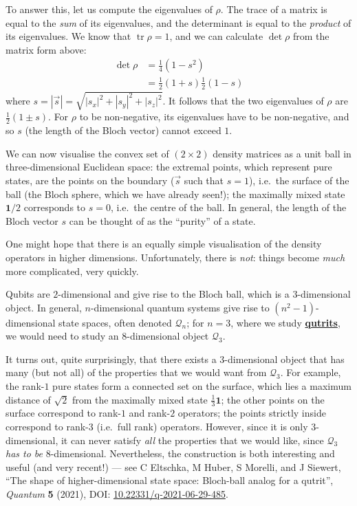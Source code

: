 \documentclass[fleqn]{article}
\newenvironment{technical}{\noindent}{\medskip}
\begin{document}
To answer this, let us compute the eigenvalues of \(\rho\).
The trace of a matrix is equal to the \emph{sum} of its eigenvalues, and the determinant is equal to the \emph{product} of its eigenvalues.
We know that \(\operatorname{tr}\rho=1\), and we can calculate \(\det\rho\) from the matrix form above:
\[
  \begin{aligned}
    \det\rho
    &= \frac{1}{4}(1-s^2)
  \\&= \frac{1}{2}(1+s)\frac{1}{2}(1-s)
  \end{aligned}
\]
where \(s=|\vec{s}|=\sqrt{|s_x|^2+|s_y|^2+|s_z|^2}\).
It follows that the two eigenvalues of \(\rho\) are \(\frac{1}{2}(1\pm s)\).
For \(\rho\) to be non-negative, its eigenvalues have to be non-negative, and so \(s\) (the length of the Bloch vector) cannot exceed \(1\).

We can now visualise the convex set of \((2\times 2)\) density matrices as a unit ball in three-dimensional Euclidean space: the extremal points, which represent pure states, are the points on the boundary (\(\vec{s}\) such that \(s=1\)), i.e.~the surface of the ball (the Bloch sphere, which we have already seen!); the maximally mixed state \(\mathbf{1}/2\) corresponds to \(s=0\), i.e.~the centre of the ball.
In general, the length of the Bloch vector \(s\) can be thought of as the ``purity'' of a state.

One might hope that there is an equally simple visualisation of the density operators in higher dimensions.
Unfortunately, there is \emph{not}: things become \emph{much} more complicated, very quickly.

\begin{technical}
Qubits are \(2\)-dimensional and give rise to the Bloch ball, which is a \(3\)-dimensional object.
In general, \(n\)-dimensional quantum systems give rise to \((n^2-1)\)-dimensional state spaces, often denoted \(\mathcal{Q}_n\); for \(n=3\), where we study \href{https://en.wikipedia.org/wiki/Qutrit}{\textbf{qutrits}}, we would need to study an \(8\)-dimensional object \(\mathcal{Q}_3\).

It turns out, quite surprisingly, that there exists a \(3\)-dimensional object that has many (but not all) of the properties that we would want from \(\mathcal{Q}_3\).
For example, the rank-\(1\) pure states form a connected set on the surface, which lies a maximum distance of \(\sqrt{2}\) from the maximally mixed state \(\frac13\mathbf{1}\); the other points on the surface correspond to rank-\(1\) and rank-\(2\) operators; the points strictly inside correspond to rank-\(3\) (i.e.~full rank) operators.
However, since it is only \(3\)-dimensional, it can never satisfy \emph{all} the properties that we would like, since \(\mathcal{Q}_3\) \emph{has to be} \(8\)-dimensional.
Nevertheless, the construction is both interesting and useful (and very recent!) --- see C Eltschka, M Huber, S Morelli, and J Siewert, ``The shape of higher-dimensional state space: Bloch-ball analog for a qutrit'', \emph{Quantum} \textbf{5} (2021), DOI: \href{https://doi.org/10.22331/q-2021-06-29-485}{10.22331/q-2021-06-29-485}.

\end{technical}
\end{document}
